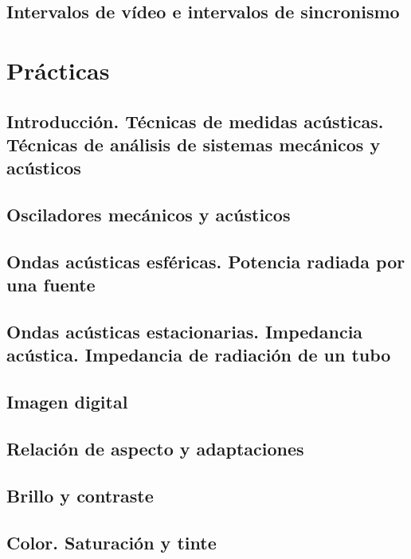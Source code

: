 \documentclass[a4paper]{book}
\begin{document}
\section{Intervalos de vídeo e intervalos de sincronismo}

\appendix

\chapter{Prácticas}
\section[Introducción. Técnicas de medidas acústicas. Técnicas de análisis de sistemas mecánicos y acústicos]{Introducción. Técnicas de medidas acústicas.\\ Técnicas de análisis de sistemas mecánicos y acústicos}
\section{Osciladores mecánicos y acústicos}
\section{Ondas acústicas esféricas. Potencia radiada por una fuente}
\section{Ondas acústicas estacionarias. Impedancia acústica. Impedancia de radiación de un tubo}
\section{Imagen digital}
\section{Relación de aspecto y adaptaciones}
\section{Brillo y contraste}
\section{Color. Saturación y tinte}


% 
\end{document}
